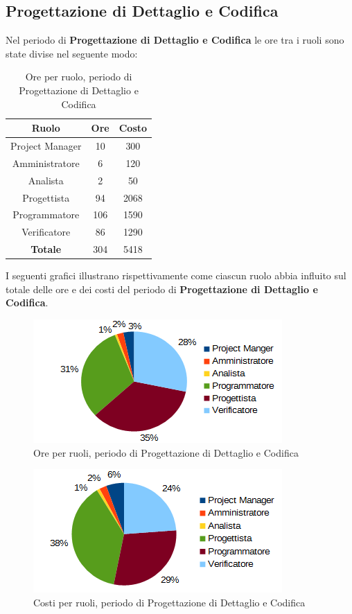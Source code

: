 	\subsection{Progettazione di Dettaglio e Codifica}
	Nel periodo di \textbf{Progettazione di Dettaglio e Codifica} le ore tra i ruoli sono state divise nel seguente modo: \\
	\begin{table}[H]
		\centering
		\begin{tabular}{|c|c|c|}
			\hline
			\textbf{Ruolo}		& \textbf{Ore}	& \textbf{Costo} \\
			\hline
			Project Manager		& 10			& 300	\\
			Amministratore		& 6				& 120	\\
			Analista			& 2				& 50	\\
			Progettista			& 94			& 2068	\\
			Programmatore		& 106			& 1590	\\
			Verificatore		& 86			& 1290	\\
			\hline
			\textbf{Totale}		& 304			& 5418	\\
			\hline
		\end{tabular}
		\caption{Ore per ruolo, periodo di Progettazione di Dettaglio e Codifica}
		\end{table}
	I seguenti grafici illustrano rispettivamente come ciascun ruolo abbia influito sul totale
delle ore e dei costi del periodo di \textbf{Progettazione di Dettaglio e Codifica}. \\
	\begin{figure}[H]
		\centering
		\includegraphics[scale=1]{immagini/grafici/progettazione_dettaglio_codifica-torta.png}
		\caption{Ore per ruoli, periodo di Progettazione di Dettaglio e Codifica}
	\end{figure}
	\begin{figure}[H]
		\centering
		\includegraphics[scale=1]{immagini/grafici/progettazione_dettaglio_codifica-torta-costo.png}
		\caption{Costi per ruoli, periodo di Progettazione di Dettaglio e Codifica}
	\end{figure}
